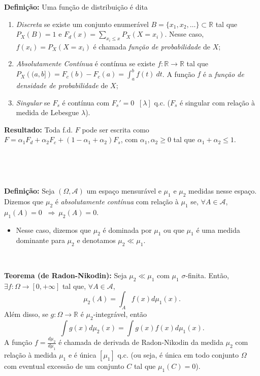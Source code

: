 \documentclass[
]{book}
\providecommand{\tightlist}{%
  \setlength{\itemsep}{0pt}\setlength{\parskip}{0pt}}
\begin{document}
\textbf{Definição:} Uma função de distribuição é dita

\begin{enumerate}
\def\labelenumi{(\roman{enumi})}
\item
  \emph{Discreta} se existe um conjunto enumerável \(B=\{x_1,x_2,\ldots\}\subset \mathbb{R}\) tal que \(P_X(B)=1\) e \(F_d(x)=\displaystyle\sum_{x_i\leq x} P_X(X=x_i)\). Nesse caso, \(f(x_i)=P_X(X=x_i)\) é chamada \emph{função de probabilidade} de \(X\);
\item
  \emph{Absolutamente Contínua} é contínua se existe \(f: \mathbb{R} \rightarrow \mathbb{R}\) tal que \(P_X\left((a,b]\right)=F_c(b)-F_c(a) = \displaystyle\int_{a}^{b} f(t)~dt\). A função \(f\) é a \emph{função de densidade de probabilidade} de \(X\);
\item
  \emph{Singular} se \(F_s\) é contínua com \(F_s'=0~\) \([\lambda]\) q.c. (\(F_s\) é singular com relação à medida de Lebesgue \(\lambda\)).
\end{enumerate}

\textbf{Resultado:} Toda f.d. \(F\) pode ser escrita como \(F=\alpha_1F_d+\alpha_2F_c+(1-\alpha_1+\alpha_2)F_s\), com \(\alpha_1,\alpha_2\geq 0\) tal que \(\alpha_1+\alpha_2\leq 1\).

\(~\)

\(~\)

\textbf{Definição:} Seja \((\Omega,\mathcal{A})\) um espaço mensurável e \(\mu_1\) e \(\mu_2\) medidas nesse espaço. Dizemos que \(\mu_2\) é \emph{absolutamente contínua} com relação à \(\mu_1\) se, \(\forall A \in \mathcal{A}\), \(\mu_1(A)=0\) \(~\Rightarrow~ \mu_2(A)=0\).

\begin{itemize}
\tightlist
\item
  Nesse caso, dizemos que \(\mu_2\) é dominada por \(\mu_1\) ou que \(\mu_1\) é uma medida dominante para \(\mu_2\) e denotamos \(\mu_2 \ll \mu_1\).
\end{itemize}

\(~\)

\textbf{Teorema (de Radon-Nikodin):} Seja \(\mu_2 \ll \mu_1\) com \(\mu_1\) \(\sigma\)-finita. Então, \(\exists f: \Omega \longrightarrow [0,+\infty]\) tal que, \(\forall A \in \mathcal{A}\),
\[\mu_2(A) = \int_A f(x) d\mu_1(x).\]
Além disso, se \(g:\Omega \longrightarrow \mathbb{R}\) é \(\mu_2\)-integrável, então
\[\int g(x) d\mu_2(x) = \int g(x) f(x) d\mu_1(x).\]
A função \(f=\frac{d\mu_2}{d\mu_1}\) é chamada de derivada de Radon-Nikodin da medida \(\mu_2\) com relação à medida \(\mu_1\) e é única \([\mu_1]\) q.c. (ou seja, é única em todo conjunto \(\Omega\) com eventual excessão de um conjunto \(C\) tal que \(\mu_1(C)=0\)).
\end{document}
